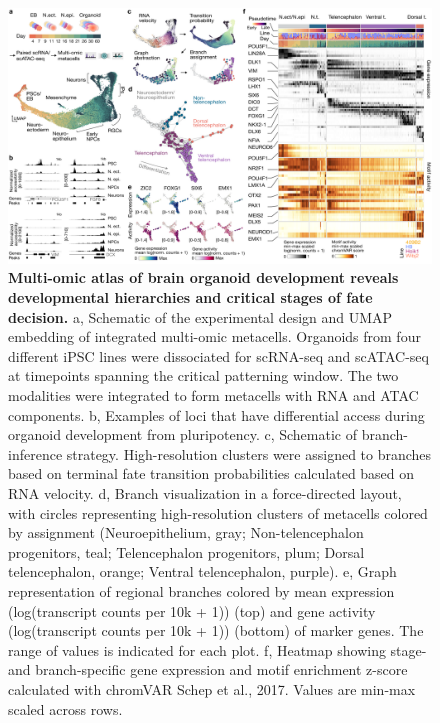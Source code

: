 \begin{figure}[b!]
    \centering
	\includegraphics[width=\textwidth]{figures/pando/Figure_1}
    \caption{\textbf{Multi-omic atlas of brain organoid development reveals developmental hierarchies and critical stages of fate decision.}
    a, Schematic of the experimental design and UMAP embedding of integrated multi-omic metacells. Organoids from four different iPSC lines were dissociated for scRNA-seq and scATAC-seq at timepoints spanning the critical patterning window. The two modalities were integrated to form metacells with RNA and ATAC components. b, Examples of loci that have differential access during organoid development from pluripotency. c, Schematic of branch-inference strategy. High-resolution clusters were assigned to branches based on terminal fate transition probabilities calculated based on RNA velocity. d, Branch visualization in a force-directed layout, with circles representing high-resolution clusters of metacells colored by assignment (Neuroepithelium, gray; Non-telencephalon progenitors, teal; Telencephalon progenitors, plum; Dorsal telencephalon, orange; Ventral telencephalon, purple). e, Graph representation of regional branches colored by mean expression (log(transcript counts per 10k + 1)) (top) and gene activity (log(transcript counts per 10k + 1))  (bottom) of marker genes. The range of values is indicated for each plot. f, Heatmap showing stage- and branch-specific gene expression and motif enrichment z-score calculated with chromVAR {Schep et al., 2017}. Values are min-max scaled across rows.}
    \label{fig:reg1}
\end{figure}

